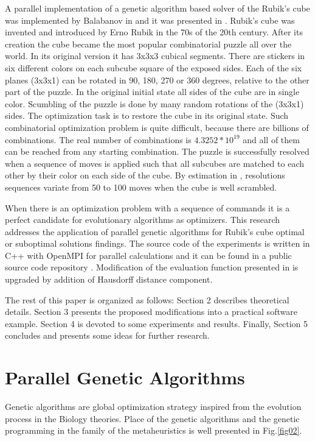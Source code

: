 \documentclass[runningheads]{llncs}
\begin{document}
A parallel implementation of a genetic algorithm based solver of the Rubik's cube was implemented by Balabanov in \cite{balabanov01} and it was presented in \cite{balabanov02}. Rubik's cube was invented and introduced by Erno Rubik in the 70s of the 20th century. After its creation the cube became the most popular combinatorial puzzle all over the world. In its original version it has 3x3x3 cubical segments. There are stickers in six different colors on each subcube square of the exposed sides. Each of the six planes (3x3x1) can be rotated in 90, 180, 270 or 360 degrees, relative to the other part of the puzzle. In the original initial state all sides of the cube are in single color. Scumbling of the puzzle is done by many random rotations of the (3x3x1) sides. The optimization task is to restore the cube in its original state. Such combinatorial optimization problem is quite difficult, because there are billions of combinations. The real number of combinations is $4.3252*10^{19}$ \cite{korf01} and all of them can be reached from any starting combination. The puzzle is successfully resolved when a sequence of moves is applied such that all subcubes are matched to each other by their color on each side of the cube. By estimation in \cite{korf01}, resolutions sequences variate from 50 to 100 moves when the cube is well scrambled. 

When there is an optimization problem with a sequence of commands it is a perfect candidate for evolutionary algorithms as optimizers. This research addresses the application of parallel genetic algorithms for Rubik's cube optimal or suboptimal solutions findings. The source code of the experiments is written in C++ with OpenMPI for parallel calculations and it can be found in a public source code repository \cite{balabanov01}. Modification of the evaluation function presented in \cite{balabanov02} is upgraded by addition of Hausdorff distance component.

The rest of this paper is organized as follows: Section 2 describes theoretical details. Section 3 presents the proposed modifications into a practical software example. Section 4 is devoted to some experiments and results. Finally, Section 5 concludes and presents some ideas for further research.

\section{Parallel Genetic Algorithms}

Genetic algorithms are global optimization strategy inspired from the evolution process in the Biology theories. Place of the genetic algorithms and the genetic programming in the family of the metaheuristics is well presented in Fig.\ref{fig02}.
\end{document}
